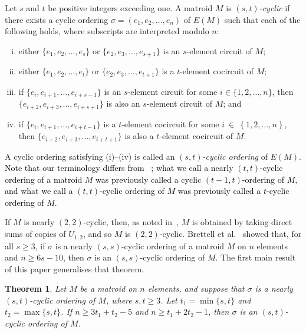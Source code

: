 \documentclass[11pt]{amsart}
\newtheorem{theorem}{Theorem}[section]
\newcommand{\bloo}{\textcolor{black}}
\begin{document}
Let $s$ and $t$ be positive integers exceeding one. A matroid $M$ is {\em $(s, t)$-cyclic} if there exists a cyclic ordering $\sigma=(e_1, e_2, \ldots, e_n)$ of $E(M)$
such that each of the following holds, where subscripts are interpreted modulo $n$:
\begin{enumerate}[(i)]
\item either $\{e_1, e_2, \ldots, e_s\}$ or $\{e_2, e_3, \ldots, e_{s+1}\}$ is an $s$-element circuit of $M$;

\item either $\{e_1, e_2, \ldots, e_t\}$ or $\{e_2, e_3, \ldots, e_{t+1}\}$ is a $t$-element cocircuit of $M$;

\item if $\{e_i, e_{i+1}, \ldots, e_{i+s-1}\}$ is an $s$-element circuit for some $i\in \{1, 2, \ldots, n\}$, then $\{e_{i+2}, e_{i+3}, \ldots, e_{i+s+1}\}$ is also an $s$-element circuit of $M$; and

\item if $\{e_i, e_{i+1}, \ldots, e_{i+t-1}\}$ is a $t$-element cocircuit for some $i~\in~\left\{1, 2, \ldots, n\right\}$, then $\{e_{i+2}, e_{i+3}, \ldots, e_{i+t+1}\}$ is also a $t$-element cocircuit of $M$.
\end{enumerate}
A cyclic ordering satisfying (i)--(iv) is called an {\em $(s, t)$-cyclic ordering} of $E(M)$. \bloo{Note that our terminology differs from ~\cite{bre19b}; what we call a nearly $(t,t)$-cyclic ordering of a matroid $M$ was previously called a cyclic $(t-1,t)$-ordering of $M$, and what we call a $(t,t)$-cyclic ordering of $M$ was previously called a $t$-cyclic ordering of $M$.}

If $M$ is nearly $(2, 2)$-cyclic, then, as noted in~\cite{bre19b}, $M$ is obtained by taking direct sums of copies of $U_{1, 2}$, and so $M$ is $(2, 2)$-cyclic. Brettell et al.~\cite[Theorem~1.1]{bre19b} showed that, for all $s\ge 3$, if $\sigma$ is a nearly $(s, s)$-cyclic ordering of a matroid $M$ on $n$ elements and $n\ge 6s-10$, then $\sigma$ is an $(s, s)$-cyclic ordering of $M$. The first main result of this paper generalises that theorem.

\begin{theorem}
Let $M$ be a matroid on $n$ elements, and suppose that $\sigma$ is a nearly $(s, t)$-cyclic ordering of $M$, where $s, t\ge 3$. Let $t_1=\min\{s, t\}$ and $t_2=\max\{s, t\}$. If $n\ge 3t_1+t_2-5$ and $n\ge t_1+2t_2-1$, then $\sigma$ is an $(s, t)$-cyclic ordering of $M$.
\label{par_to_tot}
\end{theorem}
\end{document}

